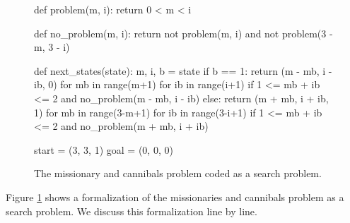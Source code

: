 \begin{figure}[!ht]
\centering
\begin{python3code}         
    def problem(m, i):
        return 0 < m < i

    def no_problem(m, i): 
        return not problem(m, i) and not problem(3 - m, 3 - i)

    def next_states(state):
        m, i, b = state
        if b == 1:
            return { (m - mb, i - ib, 0) for mb in range(m+1)
                                         for ib in range(i+1)
                                         if 1 <= mb + ib <= 2 and 
                                            no_problem(m - mb, i - ib) 
                   }
        else:
            return { (m + mb, i + ib, 1) for mb in range(3-m+1)
                                         for ib in range(3-i+1)
                                         if 1 <= mb + ib <= 2 and 
                                            no_problem(m + mb, i + ib) 
                   }

    start = (3, 3, 1)
    goal  = (0, 0, 0)
\end{python3code}
\vspace*{-0.3cm}
\caption{The missionary and cannibals problem coded as a search problem.}
\label{fig:missionaries.stlx}
\end{figure}
\noindent
Figure \ref{fig:missionaries.stlx} shows a formalization of the missionaries and cannibals problem
as a search problem.  We discuss this formalization line by line.
